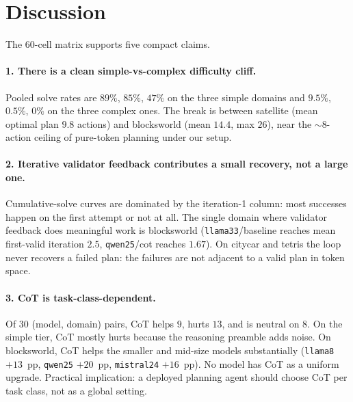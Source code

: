 
\section{Discussion}
\label{sec:discussion}

The 60-cell matrix supports five compact claims.

\paragraph{1. There is a clean simple-vs-complex difficulty cliff.}
Pooled solve rates are $89\%$, $85\%$, $47\%$ on the three simple
domains and $9.5\%$, $0.5\%$, $0\%$ on the three complex ones. The
break is between satellite (mean optimal plan $9.8$ actions) and
blocksworld (mean $14.4$, max $26$), near the $\sim$8-action ceiling
of pure-token planning under our setup.

\paragraph{2. Iterative validator feedback contributes a small recovery, not a large one.}
Cumulative-solve curves are dominated by the iteration-1 column: most
successes happen on the first attempt or not at all. The single domain
where validator feedback does meaningful work is blocksworld
(\texttt{llama33}/baseline reaches mean first-valid iteration $2.5$,
\texttt{qwen25}/cot reaches $1.67$). On citycar and tetris the loop
never recovers a failed plan: the failures are not adjacent to a valid
plan in token space.

\paragraph{3. CoT is task-class-dependent.}
Of $30$ (model, domain) pairs, CoT helps $9$, hurts $13$, and is
neutral on $8$. On the simple tier, CoT mostly hurts because the
reasoning preamble adds noise. On blocksworld, CoT helps the smaller
and mid-size models substantially (\texttt{llama8} $+13$~pp,
\texttt{qwen25} $+20$~pp, \texttt{mistral24} $+16$~pp). No model has
CoT as a uniform upgrade. Practical implication: a deployed planning
agent should choose CoT per task class, not as a global setting.

